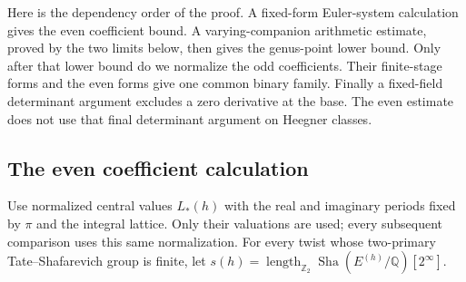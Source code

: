 \documentclass[11pt]{article}
\theoremstyle{definition}
\theoremstyle{remark}
\newcommand{\Q}{\mathbb Q}
\newcommand{\Z}{\mathbb Z}
\newcommand{\Sha}{\operatorname{Sha}}
\begin{document}
Here is the dependency order of the proof. A fixed-form Euler-system
calculation gives the even coefficient bound. A varying-companion
arithmetic estimate, proved by the two limits below, then gives the
genus-point lower bound. Only after that lower bound do we normalize
the odd coefficients. Their finite-stage forms and the even forms give
one common binary family. Finally a fixed-field determinant argument
excludes a zero derivative at the base. The even estimate does not use
that final determinant argument on Heegner classes.

\subsection{The even coefficient calculation}
Use normalized central values $L_*(h)$ with the real and imaginary
periods fixed by $\pi$ and the integral lattice. Only their valuations
are used; every subsequent comparison uses this same normalization.
For every twist whose two-primary Tate--Shafarevich group is finite, let
$s(h)=\operatorname{length}_{\Z_2}\Sha(E^{(h)}/\Q)[2^\infty]$.
\end{document}
